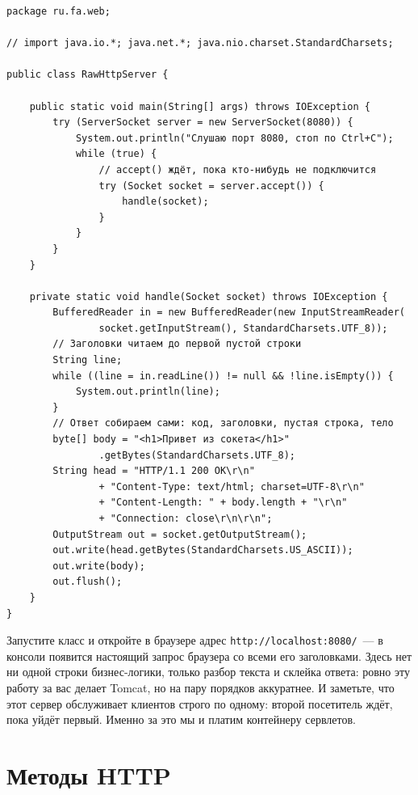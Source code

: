 \begin{listing}[H]
\begin{verbatim}
package ru.fa.web;

// import java.io.*; java.net.*; java.nio.charset.StandardCharsets;

public class RawHttpServer {

    public static void main(String[] args) throws IOException {
        try (ServerSocket server = new ServerSocket(8080)) {
            System.out.println("Слушаю порт 8080, стоп по Ctrl+C");
            while (true) {
                // accept() ждёт, пока кто-нибудь не подключится
                try (Socket socket = server.accept()) {
                    handle(socket);
                }
            }
        }
    }

    private static void handle(Socket socket) throws IOException {
        BufferedReader in = new BufferedReader(new InputStreamReader(
                socket.getInputStream(), StandardCharsets.UTF_8));
        // Заголовки читаем до первой пустой строки
        String line;
        while ((line = in.readLine()) != null && !line.isEmpty()) {
            System.out.println(line);
        }
        // Ответ собираем сами: код, заголовки, пустая строка, тело
        byte[] body = "<h1>Привет из сокета</h1>"
                .getBytes(StandardCharsets.UTF_8);
        String head = "HTTP/1.1 200 OK\r\n"
                + "Content-Type: text/html; charset=UTF-8\r\n"
                + "Content-Length: " + body.length + "\r\n"
                + "Connection: close\r\n\r\n";
        OutputStream out = socket.getOutputStream();
        out.write(head.getBytes(StandardCharsets.US_ASCII));
        out.write(body);
        out.flush();
    }
}
\end{verbatim}
\caption{Простейший HTTP-сервер на голом сокете}
\label{lst:08-3}
\end{listing}

Запустите класс и откройте в браузере адрес \texttt{http://localhost:8080/}~---
в консоли появится настоящий запрос браузера со всеми его заголовками. Здесь
нет ни одной строки бизнес-логики, только разбор текста и склейка ответа: ровно
эту работу за вас делает Tomcat, но на пару порядков аккуратнее. И заметьте,
что этот сервер обслуживает клиентов строго по одному: второй посетитель ждёт,
пока уйдёт первый. Именно за это мы и платим контейнеру сервлетов.

\section{Методы HTTP}

